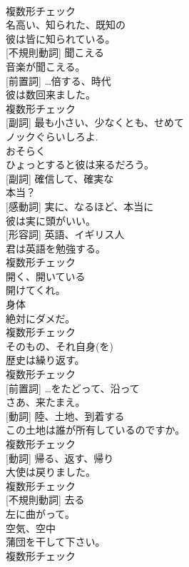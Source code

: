 \documentclass[8pt]{extreport}
\begin{document}
\begin{CJK}{UTF8}{min}
\\	複数形チェック
\\	[形容詞]	名高い、知られた、既知の	
\\	彼は皆に知られている。	
\\	[動詞] [不規則動詞]	聞こえる	
\\	音楽が聞こえる。	
\\	[名詞] [前置詞]	…倍する、時代	
\\	彼は数回来ました。	
\\	複数形チェック
\\	[形容詞] [副詞]	最も小さい、少なくとも、せめて	
\\	ノックぐらいしろよ.	
\\	[副詞]	おそらく	
\\	ひょっとすると彼は来るだろう。	
\\	[形容詞] [副詞]	確信して、確実な	
\\	本当？	
\\	[副詞] [感動詞]	実に、なるほど、本当に	
\\	彼は実に頭がいい。	
\\	[名詞] [形容詞]	英語、イギリス人	
\\	君は英語を勉強する。	
\\	複数形チェック
\\	[動詞]	開く、開いている	
\\	開けてくれ。	
\\	[名詞]	身体	
\\	絶対にダメだ。	
\\	複数形チェック
\\	[代名詞]	そのもの、それ自身(を)	
\\	歴史は繰り返す。	
\\	複数形チェック
\\	[副詞] [前置詞]	…をたどって、沿って	
\\	さあ、来たまえ。	
\\	[名詞] [動詞]	陸、土地、到着する	
\\	この土地は誰が所有しているのですか。	
\\	複数形チェック
\\	[名詞] [動詞]	帰る、返す、帰り	
\\	大使は戻りました。	
\\	複数形チェック
\\	[動詞] [不規則動詞]	去る	
\\	左に曲がって。	
\\	[名詞]	空気、空中	
\\	蒲団を干して下さい。	
\\	複数形チェック

\end{CJK}
\end{document}

